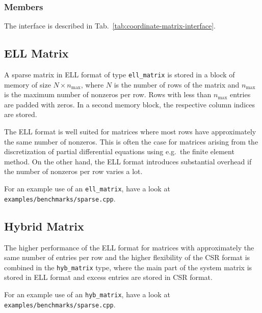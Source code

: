 \subsubsection{Members}
The interface is described in Tab.~\ref{tab:coordinate-matrix-interface}.



\subsection{ELL Matrix}
A sparse matrix in ELL format of type \lstinline|ell_matrix| is stored in a block of memory of size $N \times n_{\max}$, where $N$ is the number of rows of the matrix and $n_{\max}$ is the maximum number of nonzeros per row.
Rows with less than $n_{\max}$ entries are padded with zeros. In a second memory block, the respective column indices are stored.

The ELL format is well suited for matrices where most rows have approximately the same number of nonzeros.
This is often the case for matrices arising from the discretization of partial differential equations using e.g.~the finite element method.
On the other hand, the ELL format introduces substantial overhead if the number of nonzeros per row varies a lot.

For an example use of an \lstinline|ell_matrix|, have a look at \lstinline|examples/benchmarks/sparse.cpp|.


\subsection{Hybrid Matrix}
The higher performance of the ELL format for matrices with approximately the same number of entries per row
and the higher flexibility of the CSR format is combined in the \lstinline|hyb_matrix| type, where the main part of the system matrix is stored in ELL format and excess entries are stored in CSR format.

For an example use of an \lstinline|hyb_matrix|, have a look at \lstinline|examples/benchmarks/sparse.cpp|.



